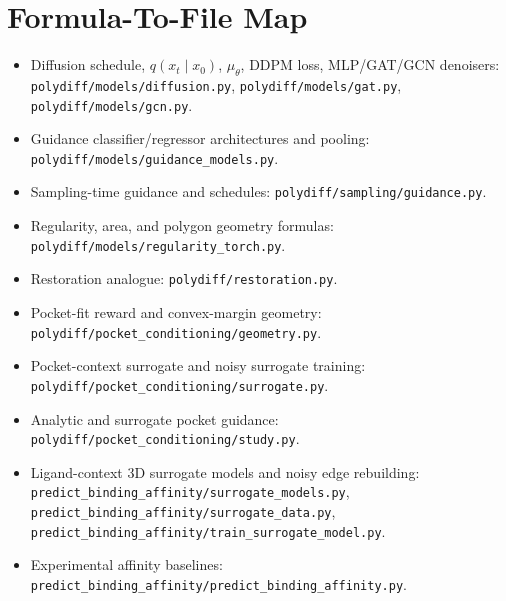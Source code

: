 \documentclass[11pt]{article}
\begin{document}
\section{Formula-To-File Map}
\begin{itemize}[leftmargin=1.5em]
\item Diffusion schedule, $q(x_t \mid x_0)$, $\mu_\theta$, DDPM loss, MLP/GAT/GCN denoisers: \texttt{polydiff/models/diffusion.py}, \texttt{polydiff/models/gat.py}, \texttt{polydiff/models/gcn.py}.
\item Guidance classifier/regressor architectures and pooling: \texttt{polydiff/models/guidance\_models.py}.
\item Sampling-time guidance and schedules: \texttt{polydiff/sampling/guidance.py}.
\item Regularity, area, and polygon geometry formulas: \texttt{polydiff/models/regularity\_torch.py}.
\item Restoration analogue: \texttt{polydiff/restoration.py}.
\item Pocket-fit reward and convex-margin geometry: \texttt{polydiff/pocket\_conditioning/geometry.py}.
\item Pocket-context surrogate and noisy surrogate training: \texttt{polydiff/pocket\_conditioning/surrogate.py}.
\item Analytic and surrogate pocket guidance: \texttt{polydiff/pocket\_conditioning/study.py}.
\item Ligand-context 3D surrogate models and noisy edge rebuilding: \texttt{predict\_binding\_affinity/surrogate\_models.py}, \texttt{predict\_binding\_affinity/surrogate\_data.py}, \texttt{predict\_binding\_affinity/train\_surrogate\_model.py}.
\item Experimental affinity baselines: \texttt{predict\_binding\_affinity/predict\_binding\_affinity.py}.
\end{itemize}
\end{document}
